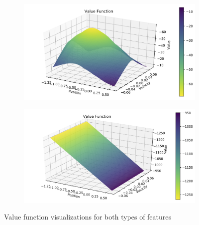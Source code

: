 \begin{figure}[H]
    \centering
    \begin{subfigure}{0.5\textwidth}
        \includegraphics[width=\linewidth]{figs/value_A.png}
        \caption{}
        \label{fig:value_a}
    \end{subfigure}%
    \begin{subfigure}{0.5\textwidth}
        \includegraphics[width=\linewidth]{figs/value_B.png}
        \caption{}
        \label{fig:value_b}
    \end{subfigure}
    \caption{Value function visualizations for both types of features}
    \label{fig:value}
\end{figure}

